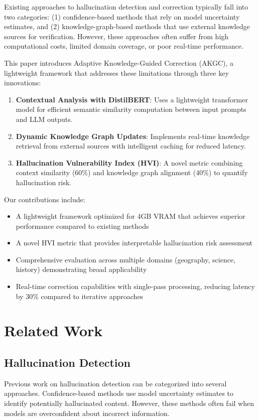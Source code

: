 \documentclass[conference]{IEEEtran}
\begin{document}
Existing approaches to hallucination detection and correction typically fall into two categories: (1) confidence-based methods that rely on model uncertainty estimates, and (2) knowledge-graph-based methods that use external knowledge sources for verification. However, these approaches often suffer from high computational costs, limited domain coverage, or poor real-time performance.

This paper introduces Adaptive Knowledge-Guided Correction (AKGC), a lightweight framework that addresses these limitations through three key innovations:

\begin{enumerate}
\item \textbf{Contextual Analysis with DistilBERT}: Uses a lightweight transformer model for efficient semantic similarity computation between input prompts and LLM outputs.
\item \textbf{Dynamic Knowledge Graph Updates}: Implements real-time knowledge retrieval from external sources with intelligent caching for reduced latency.
\item \textbf{Hallucination Vulnerability Index (HVI)}: A novel metric combining context similarity (60\%) and knowledge graph alignment (40\%) to quantify hallucination risk.
\end{enumerate}

Our contributions include:
\begin{itemize}
\item A lightweight framework optimized for 4GB VRAM that achieves superior performance compared to existing methods
\item A novel HVI metric that provides interpretable hallucination risk assessment
\item Comprehensive evaluation across multiple domains (geography, science, history) demonstrating broad applicability
\item Real-time correction capabilities with single-pass processing, reducing latency by 30\% compared to iterative approaches
\end{itemize}

\section{Related Work}
\subsection{Hallucination Detection}
Previous work on hallucination detection can be categorized into several approaches. Confidence-based methods \cite{li2020uncertainty} use model uncertainty estimates to identify potentially hallucinated content. However, these methods often fail when models are overconfident about incorrect information.
\end{document}
